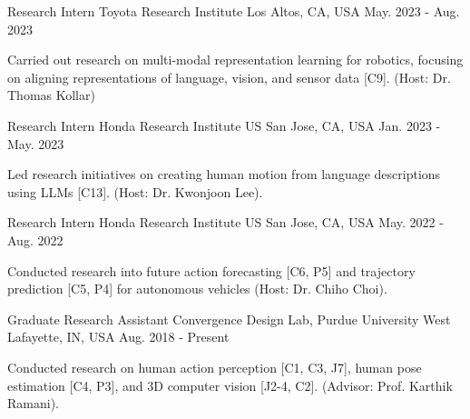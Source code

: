 


\begin{cventries}

\cventry
{Research Intern} %
{Toyota Research Institute} %
{Los Altos, CA, USA} %
{May. 2023 - Aug. 2023} %
{ %
\begin{cvitems}
    \item {Carried out research on multi-modal representation learning for robotics, focusing on aligning representations of language, vision, and sensor data [C9]. (Host: Dr. Thomas Kollar)}
\end{cvitems}
}
\vspace{-.5em}


\cventry
{Research Intern} %
{Honda Research Institute US} %
{San Jose, CA, USA} %
{Jan. 2023 - May. 2023} %
{ %
\begin{cvitems}
\item {Led research initiatives on creating human motion from language descriptions using LLMs [C13]. (Host: Dr. Kwonjoon Lee).}
\end{cvitems}
}
\vspace{-.5em}

\cventry
{Research Intern} %
{Honda Research Institute US} %
{San Jose, CA, USA} %
{May. 2022 - Aug. 2022} %
{ %
\begin{cvitems}
\item {Conducted research into future action forecasting [C6, P5] and trajectory prediction [C5, P4] for autonomous vehicles (Host: Dr. Chiho Choi).}
\end{cvitems}
}
\vspace{-.5em}

\cventry
{Graduate Research Assistant} %
{Convergence Design Lab, Purdue University} %
{West Lafayette, IN, USA} %
{Aug. 2018 - Present} %
{ %
\begin{cvitems}
\item {Conducted research on human action perception [C1, C3, J7], human pose estimation [C4, P3], and 3D computer vision [J2-4, C2]. (Advisor: Prof. Karthik Ramani).}
\end{cvitems}
}
\vspace{-.5em}


\end{cventries}
